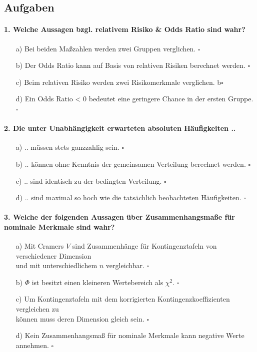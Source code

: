 \documentclass[a4paper]{article}
\begin{document}
\subsection{Aufgaben}

\paragraph{1. Welche Aussagen bzgl. relativem Risiko \& Odds Ratio sind wahr?}

\begin{itemize}
    \item[a)] Bei beiden Maßzahlen werden zwei Gruppen verglichen. \hfill $\square$
    \item[b)] Der Odds Ratio kann auf Basis von relativen Risiken berechnet werden. \hfill $\square$
    \item[c)] Beim relativen Risiko werden zwei Risikomerkmale verglichen. b\hfill $\square$
    \item[d)] Ein Odds Ratio < 0 bedeutet eine geringere Chance in der ersten Gruppe. \hfill $\square$
\end{itemize}

\paragraph{2. Die unter Unabhängigkeit erwarteten absoluten Häufigkeiten ..}

\begin{itemize}
    \item[a)] .. müssen stets ganzzahlig sein. \hfill $\square$
    \item[b)] .. können ohne Kenntnis der gemeinsamen Verteilung berechnet werden. \hfill $\square$
    \item[c)] .. sind identisch zu der bedingten Verteilung. \hfill $\square$
    \item[d)] .. sind maximal so hoch wie die tatsächlich beobachteten Häufigkeiten. \hfill $\square$
\end{itemize}

\paragraph{3. Welche der folgenden Aussagen über Zusammenhangsmaße für nominale Merkmale sind wahr?}

\begin{itemize}
    \item[a)] Mit Cramers $V$ sind Zusammenhänge für Kontingenztafeln von verschiedener Dimension\\und mit unterschiedlichem $n$ vergleichbar. \hfill $\square$
    \item[b)] $\Phi$ ist besitzt einen kleineren Wertebereich als $\chi^2$. \hfill $\square$
    \item[c)] Um Kontingenztafeln mit dem korrigierten Kontingenzkoeffizienten vergleichen zu\\können muss deren Dimension gleich sein. \hfill $\square$
    \item[d)] Kein Zusammenhangsmaß für nominale Merkmale kann negative Werte annehmen. \hfill $\square$
\end{itemize}
\end{document}
